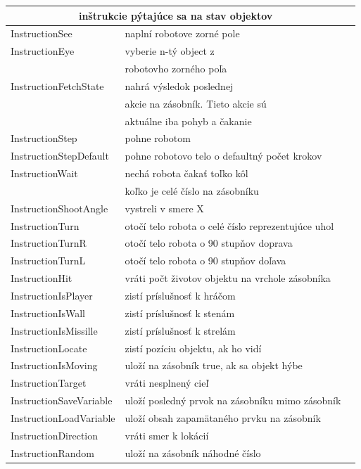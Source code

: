 \begin{center}
\begin{longtable}{|l|l|l|}
\hline
\multicolumn{2}{c}{inštrukcie pýtajúce sa na stav objektov}\\
\hline
InstructionSee& naplní robotove zorné pole\\
InstructionEye& vyberie n-tý object z \\
&robotovho zorného poľa\\
InstructionFetchState& nahrá výsledok poslednej \\
&akcie na zásobník. Tieto akcie sú \\
&aktuálne iba pohyb a čakanie\\
InstructionStep& pohne robotom\\
InstructionStepDefault& pohne robotovo telo o defaultný počet krokov\\
InstructionWait& nechá robota čakať toľko kôl\\
& koľko je celé číslo na zásobníku\\
InstructionShootAngle& vystreli v smere X\\
InstructionTurn& otočí telo robota o celé číslo reprezentujúce uhol \\
InstructionTurnR& otočí telo robota o 90 stupňov doprava\\
InstructionTurnL& otočí telo robota o 90 stupňov doľava\\
InstructionHit& vráti počt životov objektu na vrchole zásobníka\\
InstructionIsPlayer& zistí príslušnosť k hráčom\\
InstructionIsWall& zistí príslušnosť k stenám\\
InstructionIsMissille& zistí príslušnosť k strelám\\
InstructionLocate& zistí pozíciu objektu, ak ho vidí\\
InstructionIsMoving& uloží na zásobník true, ak sa objekt hýbe\\
InstructionTarget& vráti nesplnený cieľ\\
InstructionSaveVariable& uloží posledný prvok na zásobníku mimo zásobník\\
InstructionLoadVariable& uloží obsah zapamätaného prvku na zásobník \\
InstructionDirection& vráti smer k lokácií\\
InstructionRandom& uloží na zásobník náhodné číslo\\
\hline
\end{longtable}
\end{center}
